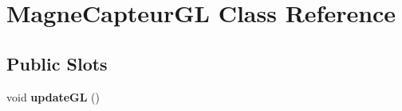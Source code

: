 \hypertarget{class_magne_capteur_g_l}{\section{Magne\-Capteur\-G\-L Class Reference}
\label{class_magne_capteur_g_l}
}
\subsection*{Public Slots}
\begin{DoxyCompactItemize}
\item 
\hypertarget{class_magne_capteur_g_l_a714d046fd31a474d1eb790a69be0e21d}{void {\bfseries update\-G\-L} ()}\label{class_magne_capteur_g_l_a714d046fd31a474d1eb790a69be0e21d}

\end{DoxyCompactItemize}
